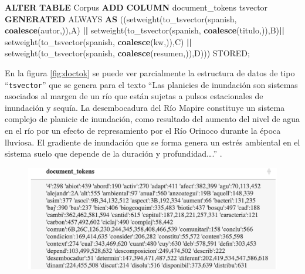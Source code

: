 \documentclass[
  12pt,
  openany]{book}
\newenvironment{Shaded}{\begin{snugshade}}{\end{snugshade}}
\newcommand{\FunctionTok}[1]{\textcolor[rgb]{0.13,0.29,0.53}{\textbf{#1}}}
\newcommand{\KeywordTok}[1]{\textcolor[rgb]{0.13,0.29,0.53}{\textbf{#1}}}
\newcommand{\NormalTok}[1]{#1}
\newcommand{\OperatorTok}[1]{\textcolor[rgb]{0.81,0.36,0.00}{\textbf{#1}}}
\newcommand{\StringTok}[1]{\textcolor[rgb]{0.31,0.60,0.02}{#1}}
\begin{document}
\begin{enumerate}
\begin{enumerate}
\begin{Shaded}
\begin{Highlighting}[]
\KeywordTok{ALTER} \KeywordTok{TABLE}\NormalTok{ Corpus }\KeywordTok{ADD} \KeywordTok{COLUMN}\NormalTok{ document\_tokens tsvector}
\KeywordTok{GENERATED}\NormalTok{ ALWAYS }\KeywordTok{AS}\NormalTok{ ((setweight(to\_tsvector(}\StringTok{\textquotesingle{}spanish\textquotesingle{}}\NormalTok{,}
                        \FunctionTok{coalesce}\NormalTok{(autor,}\StringTok{\textquotesingle{}\textquotesingle{}}\NormalTok{)),}\StringTok{\textquotesingle{}A\textquotesingle{}}\NormalTok{) }\OperatorTok{||}  
\NormalTok{                      setweight(to\_tsvector(}\StringTok{\textquotesingle{}spanish\textquotesingle{}}\NormalTok{,}
                        \FunctionTok{coalesce}\NormalTok{(titulo,}\StringTok{\textquotesingle{}\textquotesingle{}}\NormalTok{)),}\StringTok{\textquotesingle{}B\textquotesingle{}}\NormalTok{)}\OperatorTok{||}  
\NormalTok{                      setweight(to\_tsvector(}\StringTok{\textquotesingle{}spanish\textquotesingle{}}\NormalTok{,}
                        \FunctionTok{coalesce}\NormalTok{(kw,}\StringTok{\textquotesingle{}\textquotesingle{}}\NormalTok{)),}\StringTok{\textquotesingle{}C\textquotesingle{}}\NormalTok{)    }\OperatorTok{||}  
\NormalTok{                        setweight(to\_tsvector(}\StringTok{\textquotesingle{}spanish\textquotesingle{}}\NormalTok{,}
                        \FunctionTok{coalesce}\NormalTok{(resumen,}\StringTok{\textquotesingle{}\textquotesingle{}}\NormalTok{)),}\StringTok{\textquotesingle{}D\textquotesingle{}}\NormalTok{))) }
\NormalTok{                        STORED;}
\end{Highlighting}
\end{Shaded}

    En la figura \ref{fig:doctok} se puede ver parcialmente la estructura de datos de tipo ``\texttt{tsvector}'' que se genera para el texto ``Las planicies de inundación son sistemas asociados al margen de un río que están sujetas a pulsos estacionales de inundación y sequía. La desembocadura del Río Mapire constituye un sistema complejo de planicie de inundación, como resultado del aumento del nivel de agua en el río por un efecto de represamiento por el Río Orinoco durante la época lluviosa. El gradiente de inundación que se forma genera un estrés ambiental en el sistema suelo que depende de la duración y profundidad\ldots.'' .

    \begin{figure}

    {\centering \includegraphics[width=0.85\linewidth]{images/05-desarrollo/2_ciclo/esquemas/doc_tokens} 

}
\end{figure}
\end{enumerate}
\end{enumerate}
\end{document}
